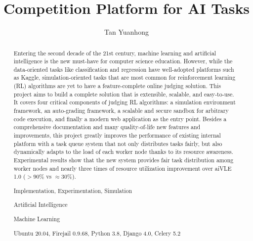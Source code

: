 \documentclass[fyp]{socreport}
\begin{document}
\title{Competition Platform for AI Tasks}
\author{Tan Yuanhong}
\maketitle
\begin{abstract}
Entering the second decade of the 21st century, machine learning and artificial intelligence is the new must-have for computer science education. However, while the data-oriented tasks like classification and regression have well-adopted platforms such as Kaggle, simulation-oriented tasks that are most common for reinforcement learning (RL) algorithms are yet to have a feature-complete online judging solution. This project aims to build a complete solution that is extensible, scalable, and easy-to-use. It covers four critical components of judging RL algorithms: a simulation environment framework, an auto-grading framework, a scalable and secure sandbox for arbitrary code execution, and finally a modern web application as the entry point. Besides a comprehensive documentation and many quality-of-life new features and improvements, this project greatly improves the performance of existing internal platform with a task queue system that not only distributes tasks fairly, but also dynamically adapts to the load of each worker node thanks to its resource awareness. Experimental results show that the new system provides fair task distribution among worker nodes and nearly three times of resource utilization improvement over aiVLE 1.0 ($>90\%$ vs $\approx 30\%$).

\begin{project-nature}
	Implementation, Experimentation, Simulation
\end{project-nature}
\begin{keywords}
    \item Artificial Intelligence
	\item Machine Learning
\end{keywords}
\begin{implement}
	Ubuntu 20.04, Firejail 0.9.68, Python 3.8, Django 4.0, Celery 5.2
\end{implement}

\end{abstract}
\end{document}
